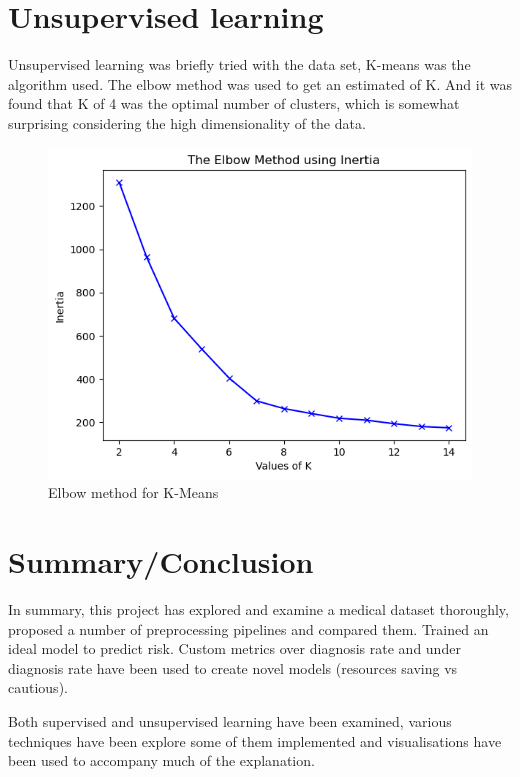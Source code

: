 \documentclass[a4paper]{article}
\begin{document}
\section{Unsupervised learning}

Unsupervised learning was briefly tried with the data set, K-means was the algorithm used. The elbow method was used to get an estimated of K. And it was found that K of 4 was the optimal number of clusters, which is somewhat surprising considering the high dimensionality of the data.

\begin{figure}[t]
    \centering
    \includegraphics[width=0.5\linewidth]{Elbw method K means.png}
    \caption{Elbow method for K-Means}
    \label{fig:enter-label}
\end{figure}
\section{Summary/Conclusion}

In summary, this project has explored and examine a medical dataset thoroughly, proposed a number of preprocessing pipelines and compared them. Trained an ideal model to predict risk. Custom metrics over diagnosis rate and under diagnosis rate have been used to create novel models (resources saving vs cautious). 

Both supervised and unsupervised learning have been examined, various techniques have been explore some of them implemented and visualisations have been used to accompany much of the explanation.



\end{document}
